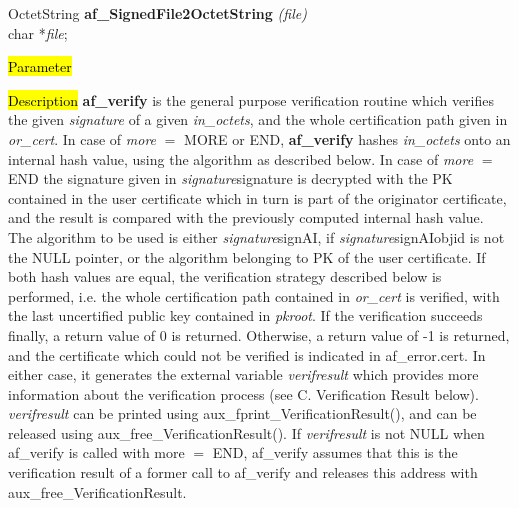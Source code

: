 OctetString {\bf *af\_SignedFile2OctetString} {\em (file)} \\
char *{\em file};

\hl{Parameter}






\hl{Description}
{\bf af\_verify} is the general purpose verification routine which verifies the given
{\em signature} of a given {\em in\_octets}, and the whole certification path given
in {\em or\_cert}. 
In case of {\em more} $=$ MORE or END, {\bf af\_verify} hashes {\em in\_octets} onto
an internal hash value, using the algorithm as described below.
In case of {\em more} $=$ END the signature given in {\em signature}\pf signature
is decrypted with the PK contained in the user certificate which in turn is part of the
originator certificate, and the result is compared
with the previously computed internal hash value. The algorithm to be used is either 
{\em signature}\pf signAI, if {\em signature}\pf signAI\pf objid is not the
NULL pointer, or the algorithm belonging to PK of the user certificate. If both hash values
are equal, the verification strategy described below is performed, i.e. the whole certification path
contained in {\em or\_cert} is verified, with the last uncertified public key
contained in {\em pkroot}. If the verification succeeds finally, a return value
of 0 is returned. Otherwise, a return value of -1 is returned, and the certificate which could
not be verified is indicated in af\_error.cert. In either case, it generates the external
variable {\em verifresult} which provides more information about the verification process (see C. Verification Result below).
{\em verifresult} can be printed using aux\_fprint\_VerificationResult(), and can be released
using aux\_free\_VerificationResult(). If {\em verifresult} is not NULL when af\_verify is
called with more $=$ END, af\_verify assumes that this is the verification result of a former call to
af\_verify and releases this address with aux\_free\_VerificationResult.

